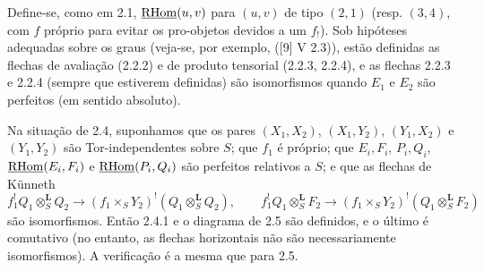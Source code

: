 Define-se, como em 2.1, $\underline{\mathrm{RHom}}(u,v)$ para $(u,v)$ de tipo $(2,1)$ (resp. $(3,4)$, com $f$ próprio para evitar os pro-objetos devidos a um $f_!$). Sob hipóteses adequadas sobre os graus (veja-se, por exemplo, ([9] V 2.3)), estão definidas as flechas de avaliação (2.2.2) e de produto tensorial (2.2.3, 2.2.4), e as flechas 2.2.3 e 2.2.4 (sempre que estiverem definidas) são isomorfismos quando $E_1$ e $E_2$ são perfeitos (em sentido absoluto).

Na situação de 2.4, suponhamos que os pares $(X_1,X_2)$, $(X_1,Y_2)$, $(Y_1,X_2)$ e $(Y_1,Y_2)$ são Tor-independentes sobre $S$; que $f_1$ é próprio; que $E_i,F_i$, $P_i,Q_i$, $\underline{\mathrm{RHom}}(E_i,F_i)$ e $\underline{\mathrm{RHom}}(P_i,Q_i)$ são perfeitos relativos a $S$; e que as flechas de Künneth
\[
f_1^!Q_1\otimes_S^{\mathbf L}Q_2\to(f_1\times_SY_2)^!(Q_1\otimes_S^{\mathbf L}Q_2),\qquad
f_1^!Q_1\otimes_S^{\mathbf L}F_2\to(f_1\times_SY_2)^!(Q_1\otimes_S^{\mathbf L}F_2)
\]
são isomorfismos. Então 2.4.1 e o diagrama de 2.5 são definidos, e o último é comutativo (no entanto, as flechas horizontais não são necessariamente isomorfismos). A verificação é a mesma que para 2.5.

